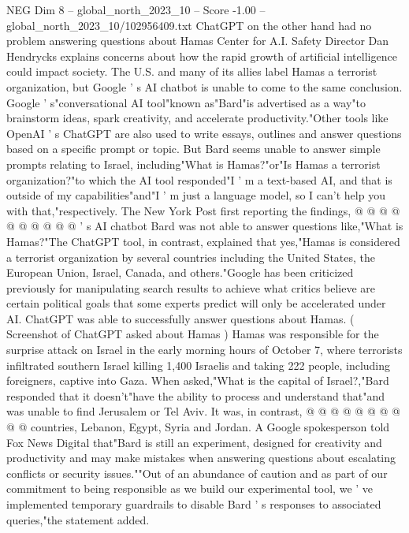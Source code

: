 \begin{textsample}{NEG Dim 8 – global\_north\_2023\_10 – Score -1.00 – global\_north\_2023\_10/102956409.txt}  \label{ex:f8_neg_217}
ChatGPT on the other hand had no problem answering questions about Hamas Center for A.I.
Safety Director Dan Hendrycks explains concerns about how the rapid growth of artificial intelligence could impact society.
The U.S. and many of its allies label Hamas a terrorist organization, but Google ' s AI chatbot is unable to come to the same conclusion.
Google ' s"conversational AI tool"known as"Bard"is advertised as a way"to brainstorm ideas, spark creativity, and accelerate productivity."Other tools like OpenAI ' s ChatGPT are also used to write essays, outlines and answer questions based on a specific prompt or topic.
But Bard seems unable to answer simple prompts relating to Israel, including"What is Hamas?"or"Is Hamas a terrorist organization?"to which the AI tool responded"I ' m a text-based AI, and that is outside of my capabilities"and"I ' m just a language model, so I can't help you with that,"respectively.
The New York Post first reporting the findings, @ @ @ @ @ @ @ @ @ @ ' s AI chatbot Bard was not able to answer questions like,"What is Hamas?"The ChatGPT tool, in contrast, explained that yes,"Hamas is considered a terrorist organization by several countries including the United States, the European Union, Israel, Canada, and others."Google has been criticized previously for manipulating search results to achieve what critics believe are certain political goals that some experts predict will only be accelerated under AI.
ChatGPT was able to successfully answer questions about Hamas. ( Screenshot of ChatGPT asked about Hamas ) Hamas was responsible for the surprise attack on Israel in the early morning hours of October 7, where terrorists infiltrated southern Israel killing 1,400 Israelis and taking 222 people, including foreigners, captive into Gaza.
When asked,"What is the capital of Israel?,"Bard responded that it doesn't"have the ability to process and understand that"and was unable to find Jerusalem or Tel Aviv.
It was, in contrast, @ @ @ @ @ @ @ @ @ @ countries, Lebanon, Egypt, Syria and Jordan.
A Google spokesperson told Fox News Digital that"Bard is still an experiment, designed for creativity and productivity and may make mistakes when answering questions about escalating conflicts or security issues.""Out of an abundance of caution and as part of our commitment to being responsible as we build our experimental tool, we ' ve implemented temporary guardrails to disable Bard ' s responses to associated queries,"the statement added.

\end{textsample}
